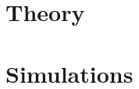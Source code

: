 \documentclass[a4paper,twoside]{book}
\begin{document}
     


\chapter{Theory}


\chapter{Simulations}



\end{document}
